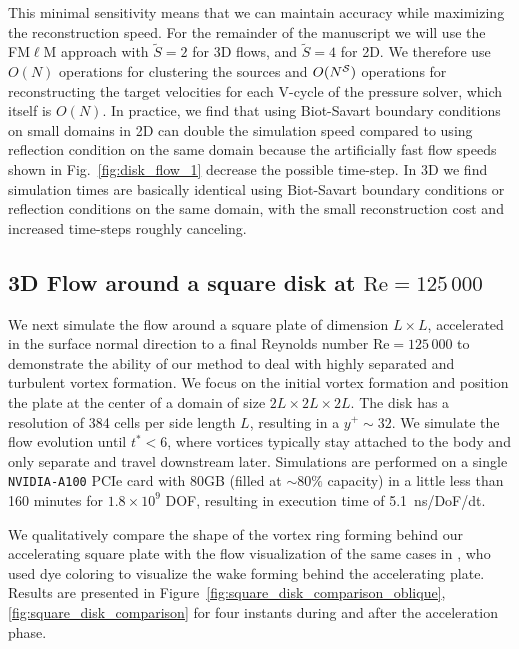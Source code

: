 \documentclass[11pt]{article}
\begin{document}
This minimal sensitivity means that we can maintain accuracy while maximizing the reconstruction speed. For the remainder of the manuscript we will use the FM$\ell$M approach with $\tilde S = 2$ for 3D flows, and $\tilde S = 4$ for 2D. We therefore use $O(N)$ operations for clustering the sources and $O(N^{\cal S})$ operations for reconstructing the target velocities for each V-cycle of the pressure solver, which itself is $O(N)$. In practice, we find that using Biot-Savart boundary conditions on small domains in 2D can double the simulation speed compared to using reflection condition on the same domain because the artificially fast flow speeds shown in Fig.~\ref{fig:disk_flow_1} decrease the possible time-step. In 3D we find simulation times are basically identical using Biot-Savart boundary conditions or reflection conditions on the same domain, with the small reconstruction cost and increased time-steps roughly canceling.

\subsection{3D Flow around a square disk at $\text{Re}=125\,000$}

We next simulate the flow around a square plate of dimension $L\times L$, accelerated in the surface normal direction to a final Reynolds number $\text{Re}=125\,000$ to demonstrate the ability of our method to deal with highly separated and turbulent vortex formation. We focus on the initial vortex formation and position the plate at the center of a domain of size $2L\times2L\times2L$. The disk has a resolution of 384 cells per side length $L$, resulting in a $y^+\sim 32$. We simulate the flow evolution until $t^*<6$, where vortices typically stay attached to the body and only separate and travel downstream later. Simulations are performed on a single \texttt{NVIDIA-A100} PCIe card with 80GB (filled at $\sim80\%$ capacity) in a little less than 160 minutes for $1.8\times10^9$ DOF, resulting in execution time of 5.1~ns/DoF/dt.


We qualitatively compare the shape of the vortex ring forming behind our accelerating square plate with the flow visualization of the same cases in \cite{Higuchi1996Three-dimensionalPlates}, who used dye coloring to visualize the wake forming behind the accelerating plate. Results are presented in Figure~\ref{fig:square_disk_comparison_oblique}, \ref{fig:square_disk_comparison} for four instants during and after the acceleration phase. 
\end{document}
